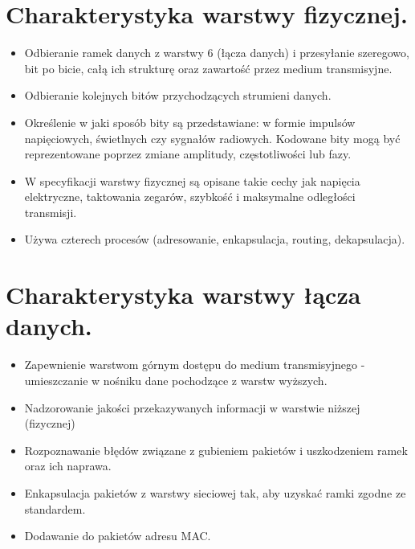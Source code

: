 \documentclass[12pt,a4paper]{article}
\begin{document}
	\section{Charakterystyka warstwy fizycznej.}
	\begin{itemize}
		\item Odbieranie ramek danych z warstwy 6 (łącza danych) i przesyłanie szeregowo, bit po bicie, całą ich strukturę oraz zawartość przez medium transmisyjne.
		\item Odbieranie kolejnych bitów przychodzących strumieni danych.
		\item Określenie w jaki sposób bity są przedstawiane: w formie impulsów napięciowych, świetlnych czy sygnałów radiowych. Kodowane bity mogą być reprezentowane poprzez zmiane amplitudy, częstotliwości lub fazy.
		\item W specyfikacji warstwy fizycznej są opisane takie cechy jak napięcia elektryczne, taktowania zegarów, szybkość i maksymalne odległości transmisji.
		\item Używa czterech procesów (adresowanie, enkapsulacja, routing, dekapsulacja).
	\end{itemize}

	\section{Charakterystyka warstwy łącza danych.}
	\begin{itemize}
		\item Zapewnienie warstwom górnym dostępu do medium transmisyjnego - umieszczanie w nośniku dane pochodzące z warstw wyższych.
		\item Nadzorowanie jakości przekazywanych informacji w warstwie niższej (fizycznej)
		\item Rozpoznawanie błędów związane z gubieniem pakietów i uszkodzeniem ramek oraz ich naprawa.
		\item Enkapsulacja pakietów z warstwy sieciowej tak, aby uzyskać ramki zgodne ze standardem.
		\item Dodawanie do pakietów adresu MAC.
	\end{itemize}
\end{document}
